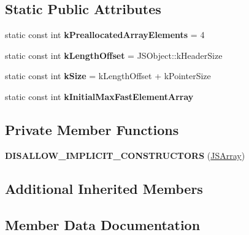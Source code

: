 \subsection*{Static Public Attributes}
\begin{DoxyCompactItemize}
\item 
static const int {\bfseries k\+Preallocated\+Array\+Elements} = 4\hypertarget{classv8_1_1internal_1_1_j_s_array_a67bc60ae3f9c63e64f3b8cc94d718bc0}{}\label{classv8_1_1internal_1_1_j_s_array_a67bc60ae3f9c63e64f3b8cc94d718bc0}

\item 
static const int {\bfseries k\+Length\+Offset} = J\+S\+Object\+::k\+Header\+Size\hypertarget{classv8_1_1internal_1_1_j_s_array_aea530131fca7e137fdd66ad7215a8352}{}\label{classv8_1_1internal_1_1_j_s_array_aea530131fca7e137fdd66ad7215a8352}

\item 
static const int {\bfseries k\+Size} = k\+Length\+Offset + k\+Pointer\+Size\hypertarget{classv8_1_1internal_1_1_j_s_array_ab3779f1079b0ff1ef3ba3ae3fa226ba0}{}\label{classv8_1_1internal_1_1_j_s_array_ab3779f1079b0ff1ef3ba3ae3fa226ba0}

\item 
static const int {\bfseries k\+Initial\+Max\+Fast\+Element\+Array}
\end{DoxyCompactItemize}
\subsection*{Private Member Functions}
\begin{DoxyCompactItemize}
\item 
{\bfseries D\+I\+S\+A\+L\+L\+O\+W\+\_\+\+I\+M\+P\+L\+I\+C\+I\+T\+\_\+\+C\+O\+N\+S\+T\+R\+U\+C\+T\+O\+RS} (\hyperlink{classv8_1_1internal_1_1_j_s_array}{J\+S\+Array})\hypertarget{classv8_1_1internal_1_1_j_s_array_a44e94e522910a3a815ac24cf2bd4013c}{}\label{classv8_1_1internal_1_1_j_s_array_a44e94e522910a3a815ac24cf2bd4013c}

\end{DoxyCompactItemize}
\subsection*{Additional Inherited Members}


\subsection{Member Data Documentation}
